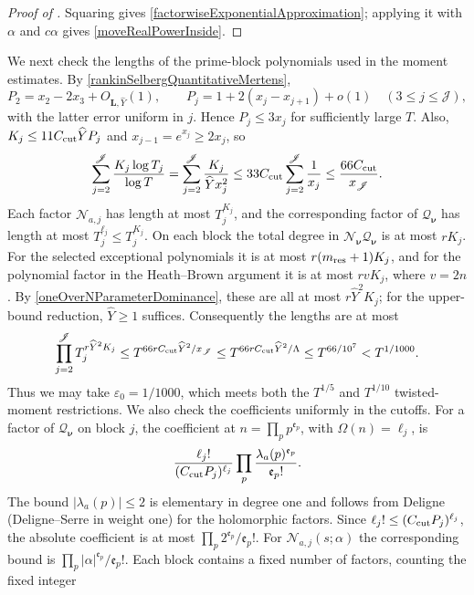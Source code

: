 \documentclass[oneside, 12pt]{amsart}
\theoremstyle{definition}
\begin{document}
{\begin{proof}[Proof of ]
			Squaring gives \eqref{factorwiseExponentialApproximation}; applying it
			with $\alpha$ and $c\alpha$ gives \eqref{moveRealPowerInside}.
		\end{proof}
		
		We next check the lengths of the prime-block polynomials used in
		the moment estimates. By \eqref{rankinSelbergQuantitativeMertens},
		\[
		P_2=x_2-2x_3+O_{\boldsymbol L,\widehat Y}(1),\qquad
		P_j=1+2(x_j-x_{j+1})+o(1)\quad(3\leq j\leq\mathscr J),
		\]
		with the latter error uniform in $j$. Hence $P_j\leq3x_j$ for
		sufficiently large $T$. Also,
		$K_j\leq11C_{\rm cut}\widehat YP_j$ and
		$x_{j-1}=e^{x_j}\geq2x_j$, so
		\[
		\sum_{j=2}^{\mathscr J}\frac{K_j\log T_j}{\log T}
		=\sum_{j=2}^{\mathscr J}\frac{K_j}{\widehat Yx_j^2}
		\leq33C_{\rm cut}\sum_{j=2}^{\mathscr J}\frac1{x_j}
		\leq\frac{66C_{\rm cut}}{x_{\mathscr J}}.
		\]
		Each factor $\mathcal N_{a,j}$ has length at most $T_j^{K_j}$,
		and the corresponding factor of $\mathcal Q_{\boldsymbol\nu}$ has length at most
		$T_j^{\ell_j}\leq T_j^{K_j}$. On each block the total degree in
		$\mathcal N_{\boldsymbol\nu}\mathcal Q_{\boldsymbol\nu}$ is at most
		$rK_j$. For the selected exceptional polynomials it is at most
		$r(m_{\rm res}+1)K_j$, and for the polynomial factor in the
		Heath--Brown argument it is at most $rvK_j$, where $v=2n$.
		By \eqref{oneOverNParameterDominance}, these are all at most
		$r\widehat Y^2K_j$; for the upper-bound reduction, $\widehat Y\geq1$
		suffices. Consequently the lengths are at most
		\[
		\prod_{j=2}^{\mathscr J}T_j^{r\widehat Y^2K_j}
		\leq T^{66rC_{\rm cut}\widehat Y^2/x_{\mathscr J}}
		\leq T^{66rC_{\rm cut}\widehat Y^2/\Lambda}
		\leq T^{66/10^7}<T^{1/1000}.
		\]
		Thus we may take $\varepsilon_0=1/1000$, which meets both the
		$T^{1/5}$ and $T^{1/10}$ twisted-moment restrictions.
		We also check the coefficients uniformly in the cutoffs. For a factor
		of $\mathcal Q_{\boldsymbol\nu}$ on block $j$, the coefficient at
		$n=\prod_p p^{\mathfrak e_p}$, with $\Omega(n)=\ell_j$, is
		\[
		\frac{\ell_j!}{(C_{\rm cut}P_j)^{\ell_j}}
		\prod_p\frac{\lambda_a(p)^{\mathfrak e_p}}{\mathfrak e_p!}.
		\]
		The bound $|\lambda_a(p)|\leq2$ is elementary in degree one and follows
		from Deligne \cite{Deligne} (Deligne--Serre \cite{DeligneSerre} in weight one) for the holomorphic factors.
		Since $\ell_j!\leq(C_{\rm cut}P_j)^{\ell_j}$, the absolute coefficient
		is at most $\prod_p2^{\mathfrak e_p}/\mathfrak e_p!$.
		For $\mathcal N_{a,j}(s;\alpha)$ the corresponding bound is
		$\prod_p|\alpha|^{\mathfrak e_p}/\mathfrak e_p!$.
		Each block contains a fixed number of factors, counting the fixed integer
}
\end{document}
